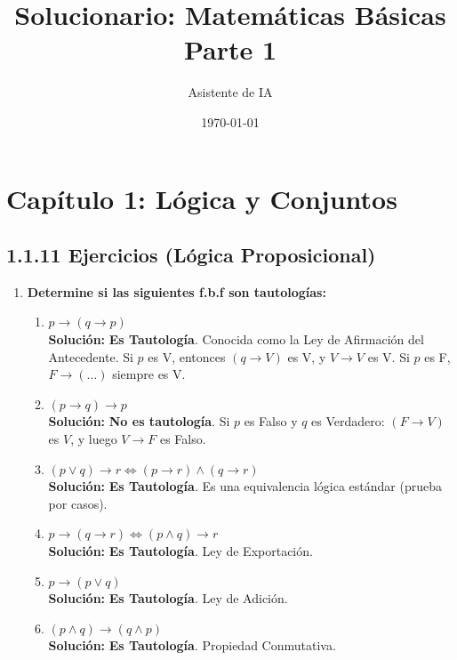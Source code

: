\documentclass[letterpaper, 12pt]{article}
\title{\textbf{Solucionario: Matemáticas Básicas}\\Parte 1}
\author{Asistente de IA}
\date{\today}
\begin{document}
\maketitle
\tableofcontents
\newpage

\section{Capítulo 1: Lógica y Conjuntos}

\subsection{1.1.11 Ejercicios (Lógica Proposicional)}

\begin{enumerate}
    \item \textbf{Determine si las siguientes f.b.f son tautologías:}
    
    \begin{enumerate}
        \item $p \to (q \to p)$ \\
        \textbf{Solución:} \textbf{Es Tautología}. Conocida como la Ley de Afirmación del Antecedente. Si $p$ es V, entonces $(q \to V)$ es V, y $V \to V$ es V. Si $p$ es F, $F \to (\dots)$ siempre es V.
        
        \item $(p \to q) \to p$ \\
        \textbf{Solución:} \textbf{No es tautología}. Si $p$ es Falso y $q$ es Verdadero: $(F \to V)$ es $V$, y luego $V \to F$ es Falso.
        
        \item $(p \lor q) \to r \iff (p \to r) \land (q \to r)$ \\
        \textbf{Solución:} \textbf{Es Tautología}. Es una equivalencia lógica estándar (prueba por casos).
        
        \item $p \to (q \to r) \iff (p \land q) \to r$ \\
        \textbf{Solución:} \textbf{Es Tautología}. Ley de Exportación.
        
        \item $p \to (p \lor q)$ \\
        \textbf{Solución:} \textbf{Es Tautología}. Ley de Adición.
        
        \item $(p \land q) \to (q \land p)$ \\
        \textbf{Solución:} \textbf{Es Tautología}. Propiedad Conmutativa.
    \end{enumerate}


\end{enumerate}
\end{document}
